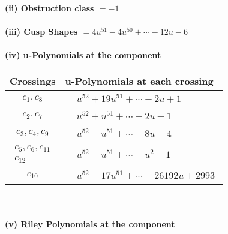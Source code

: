 \documentclass[1p]{elsarticle_modified}
\theoremstyle{definition}
\begin{document}
\flushleft \textbf{(ii) Obstruction class $= -1$}\\~\\
\flushleft \textbf{(iii) Cusp Shapes $= 4 u^{51}-4 u^{50}+\cdots-12 u-6$}\\~\\
\newpage\renewcommand{\arraystretch}{1}
\flushleft \textbf{(iv) u-Polynomials at the component}\newline \\
\begin{tabular}{m{50pt}|m{274pt}}
Crossings & \hspace{64pt}u-Polynomials at each crossing \\
\hline $$\begin{aligned}c_{1},c_{8}\end{aligned}$$&$\begin{aligned}
&u^{52}+19 u^{51}+\cdots-2 u+1
\end{aligned}$\\
\hline $$\begin{aligned}c_{2},c_{7}\end{aligned}$$&$\begin{aligned}
&u^{52}+u^{51}+\cdots-2 u-1
\end{aligned}$\\
\hline $$\begin{aligned}c_{3},c_{4},c_{9}\end{aligned}$$&$\begin{aligned}
&u^{52}- u^{51}+\cdots-8 u-4
\end{aligned}$\\
\hline $$\begin{aligned}c_{5},c_{6},c_{11}\\c_{12}\end{aligned}$$&$\begin{aligned}
&u^{52}- u^{51}+\cdots- u^2-1
\end{aligned}$\\
\hline $$\begin{aligned}c_{10}\end{aligned}$$&$\begin{aligned}
&u^{52}-17 u^{51}+\cdots-26192 u+2993
\end{aligned}$\\
\hline
\end{tabular}\\~\\
\newpage\renewcommand{\arraystretch}{1}
\flushleft \textbf{(v) Riley Polynomials at the component}\newline \\
\end{document}
